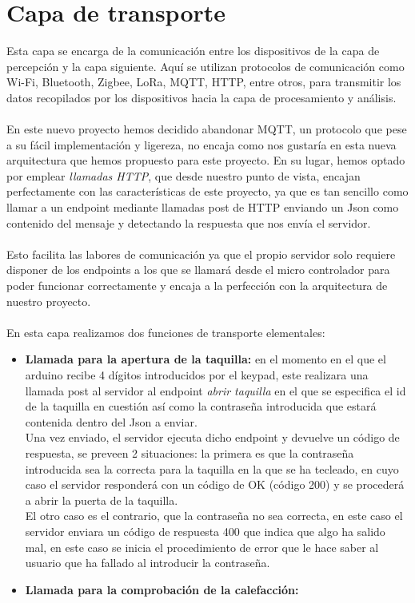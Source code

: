 \documentclass[12pt]{report}
\begin{document}
\section{Capa de transporte} %
Esta capa se encarga de la comunicación entre los dispositivos de la capa de percepción y la capa siguiente. Aquí se utilizan protocolos de comunicación como Wi-Fi, Bluetooth, Zigbee, LoRa, MQTT, HTTP, entre otros, para transmitir los datos recopilados por los dispositivos hacia la capa de procesamiento y análisis.
\\\\
En este nuevo proyecto hemos decidido abandonar MQTT, un protocolo que pese a su fácil implementación y ligereza, no encaja como nos gustaría en esta nueva arquitectura que hemos propuesto para este proyecto. 
En su lugar, hemos optado por emplear \textit{llamadas HTTP}, que desde nuestro punto de vista, encajan perfectamente con las características de este proyecto, ya que es tan sencillo como llamar a un endpoint mediante llamadas post de HTTP enviando un Json como contenido del mensaje y detectando la respuesta que nos envía el servidor. 
\\\\
Esto facilita las labores de comunicación ya que el propio servidor solo requiere disponer de los endpoints a los que se llamará desde el micro controlador para poder funcionar correctamente y encaja a la perfección con la arquitectura de nuestro proyecto.
\\\\
En esta capa realizamos dos funciones de transporte elementales:
\begin{itemize}
    \item \textbf{Llamada para la apertura de la taquilla:} en el momento en el que el arduino recibe 4 dígitos introducidos por el keypad, este realizara una llamada post al servidor al endpoint \textit{abrir taquilla} en el que se especifica el id de la taquilla en cuestión así como la contraseña introducida que estará contenida dentro del Json a enviar. 
    \\ Una vez enviado, el servidor ejecuta dicho endpoint y devuelve un código de respuesta, se preveen 2 situaciones: la primera es que la contraseña introducida sea la correcta para la taquilla en la que se ha tecleado, en cuyo caso el servidor responderá con un código de OK (código 200) y se procederá a abrir la puerta de la taquilla. 
    \\ El otro caso es el contrario, que la contraseña no sea correcta, en este caso el servidor enviara un código de respuesta 400 que indica que algo ha salido mal, en este caso se inicia el procedimiento de error que le hace saber al usuario que ha fallado al introducir la contraseña.
    \item \textbf{Llamada para la comprobación de la calefacción:} 
\end{itemize}
\end{document}

